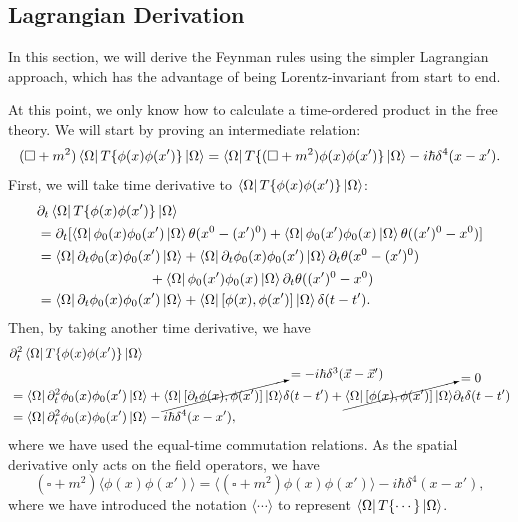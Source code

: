 \documentclass[11pt]{article}
\theoremstyle{definition}
\begin{document}
\subsection{Lagrangian Derivation}
In this section, we will derive the Feynman rules using the simpler Lagrangian approach, which has the advantage of being Lorentz-invariant from start to end.

At this point, we only know how to calculate a time-ordered product in the free theory. We will start by proving an intermediate relation:
\begin{equation}
    (\square + m^2)\bra{\Omega}T\{\phi(x)\phi(x')\}\ket{\Omega} = \bra{\Omega}T\{(\square+m^2)\phi(x)\phi(x')\}\ket{\Omega} - i\hbar \delta^4(x-x').
\end{equation}
First, we will take time derivative to $\bra{\Omega}T\{\phi(x)\phi(x')\}\ket{\Omega}$:
\begin{equation}
\begin{aligned}
        &\partial_t\bra{\Omega}T\{\phi(x)\phi(x')\}\ket{\Omega}\\
        &= \partial_t[\bra{\Omega}\phi_0(x)\phi_0(x')\ket{\Omega}\theta(x^0-(x')^0) + \bra{\Omega}\phi_0(x')\phi_0(x)\ket{\Omega}\theta((x')^0-x^0)]\\
        &= \bra{\Omega}\partial_t\phi_0(x)\phi_0(x')\ket{\Omega} + \bra{\Omega}\partial_t\phi_0(x)\phi_0(x')\ket{\Omega}\partial
        _t\theta(x^0-(x')^0)\\ 
        & \qquad \qquad \qquad \qquad+\bra{\Omega}\phi_0(x')\phi_0(x)\ket{\Omega}\partial_t\theta((x')^0-x^0) \\
        &=\bra{\Omega}\partial_t\phi_0(x)\phi_0(x')\ket{\Omega} + \bra{\Omega}[\phi(x),\phi(x')]\ket{\Omega}\delta(t-t').
\end{aligned}
\end{equation}
Then, by taking another time derivative, we have
\begin{equation}
\begin{aligned}
    &\partial_t^2\bra{\Omega}T\{\phi(x)\phi(x')\}\ket{\Omega}\\
    &=\bra{\Omega}\partial_t^2\phi_0(x)\phi_0(x')\ket{\Omega} + \cancelto{=-i\hbar\delta^3(\vec{x}-\vec{x}')}{\bra{\Omega}[\partial_t\phi(x),\phi(x')]\ket{\Omega}}\delta(t-t') +  \cancelto{=0}{\bra{\Omega}[\phi(x),\phi(x')]\ket{\Omega}}\partial_t\delta(t-t')\\
    &=\bra{\Omega}\partial_t^2\phi_0(x)\phi_0(x')\ket{\Omega} -i\hbar\delta^4(x-x'),
\end{aligned}
\end{equation}
where we have used the equal-time commutation relations. As the spatial derivative only acts on the field operators, we have
\begin{equation}
    (\square+m^2)\langle\phi(x)\phi(x')\rangle = \langle(\square+m^2)\phi(x)\phi(x')\rangle - i\hbar\delta^4(x-x'),
\end{equation}
where we have introduced the notation $\langle\cdots\rangle$ to represent $\bra{\Omega}T\{\cdots\}\ket{\Omega}$.
\end{document}
